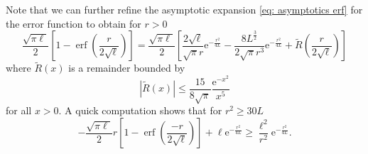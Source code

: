 \documentclass[11pt, reqno]{amsart}
\numberwithin{equation}{section}
\begin{document}
Note that we can further refine the asymptotic expansion \ref{eq: asymptotics erf} for the error function to obtain for $r>0$
\begin{equation*}
    \frac{\sqrt{\pi \ell}}{2}  \left[1-\operatorname{erf}\left(\frac{ r}{2 \sqrt{\ell}}\right)\right] =  \frac{\sqrt{\pi \ell}}{2} \left[\frac{2\sqrt{\ell}}{\sqrt{\pi}r}\mathrm{e}^{-\frac{r^2}{4L}} -\frac{8L^{\frac{3}{2}}}{2\sqrt{\pi}r^3}\mathrm{e}^{-\frac{r^2}{4L}}+  \tilde{R}\left(\frac{r}{2\sqrt{\ell}}\right) \right]
\end{equation*}
where $\tilde{R}(x)$ is a remainder bounded by
\begin{equation*}
    |\tilde{R}(x)|\le \frac{15}{8\sqrt{\pi}}\frac{\mathrm{e}^{-x^2}}{x^5}
\end{equation*}
for all $x>0$. A quick computation shows that for $r^2\ge 30L$
\begin{equation*}
    -\frac{\sqrt{\pi \ell}}{2} r  \left[1-\operatorname{erf}\left(\frac{ -r}{2 \sqrt{\ell}}\right)\right]+ \ell\mathrm{e}^{- \frac{r^{2}}{4L} }\ge \frac{\ell^2}{r^2}\mathrm{e}^{-\frac{r^2}{4L}}.
\end{equation*}

 
 
\end{document}
